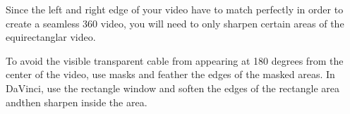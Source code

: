 \begin{fullwidth}

Since the left and right edge of your video have to match perfectly in order to create a seamless 360 video, you will need to only sharpen certain areas of the equirectanglar video.

To avoid the visible transparent cable from appearing at 180 degrees from the center of the video, use masks and feather the edges of the masked areas. In DaVinci, use the rectangle window and soften the edges of the rectangle area andthen sharpen inside the area.



\end{fullwidth}